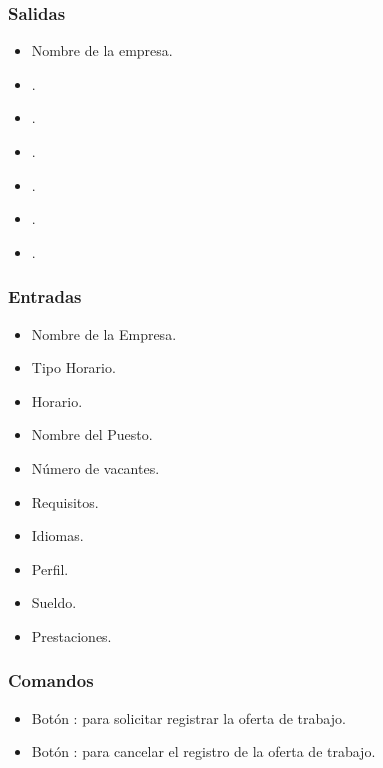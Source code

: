 \pagebreak
{}

\subsubsection{Salidas}
	\begin{itemize}
		\item Nombre de la empresa.
		\item {}.
		\item {}.
		\item {}.
		\item {}.
		\item {}.
		\item {}.
	\end{itemize}

\subsubsection{Entradas}
	\begin{itemize}
		\item Nombre de la Empresa.
		\item Tipo Horario.
		\item Horario.
		\item Nombre del Puesto.
		\item Número de vacantes.
		\item Requisitos.
		\item Idiomas.
		\item Perfil.
		\item Sueldo.
		\item Prestaciones. 
	\end{itemize}

\subsubsection{Comandos}
	\begin{itemize}
		\item Botón : para solicitar registrar la oferta de trabajo.  
		\item Botón : para cancelar el registro de la oferta de trabajo.  
	\end{itemize}


